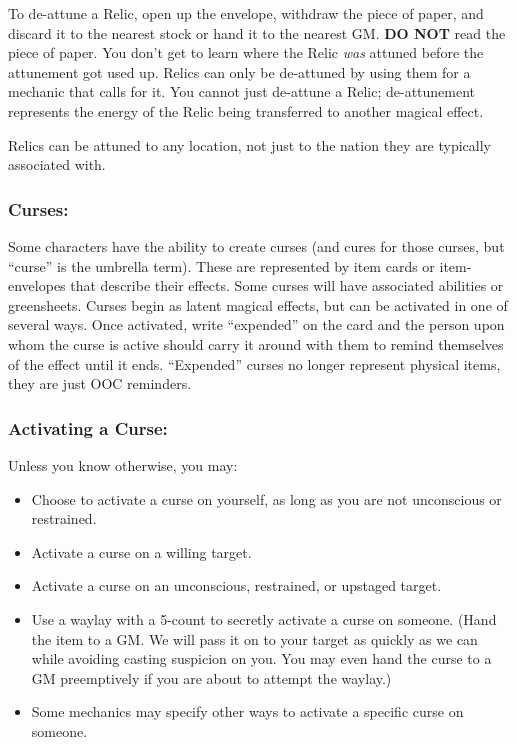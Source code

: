 \documentclass[sheet]{GL2020}
\begin{document}
{To de-attune a Relic, open up the envelope, withdraw the piece of paper, and discard it to the nearest stock or hand it to the nearest GM. \textbf{DO NOT} read the piece of paper. You don’t get to learn where the Relic \emph{was} attuned before the attunement got used up. Relics can only be de-attuned by using them for a mechanic that calls for it. You cannot just de-attune a Relic; de-attunement represents the energy of the Relic being transferred to another magical effect.

Relics can be attuned to any location, not just to the nation they are typically associated with.

\subsubsection{Curses:}
Some characters have the ability to create curses (and cures for those curses, but ``curse'' is the umbrella term). These are represented by item cards or item-envelopes that describe their effects. Some curses will have associated abilities or greensheets. Curses begin as latent magical effects, but can be activated in one of several ways. Once activated, write ``expended'' on the card and the person upon whom the curse is active should carry it around with them to remind themselves of the effect until it ends. ``Expended'' curses no longer represent physical items, they are just OOC reminders.

\subsubsection{Activating a Curse:}
Unless you know otherwise, you may:
\begin{itemize}
	\item Choose to activate a curse on yourself, as long as you are not unconscious or restrained.
	\item Activate a curse on a willing target. 
	\item Activate a curse on an unconscious, restrained, or upstaged target.
	\item Use a waylay with a 5-count to secretly activate a curse on someone. (Hand the item to a GM. We will pass it on to your target as quickly as we can while avoiding casting suspicion on you. You may even hand the curse to a GM preemptively if you are about to attempt the waylay.)
	\item Some mechanics may specify other ways to activate a specific curse on someone.
\end{itemize}

}
\end{document}
